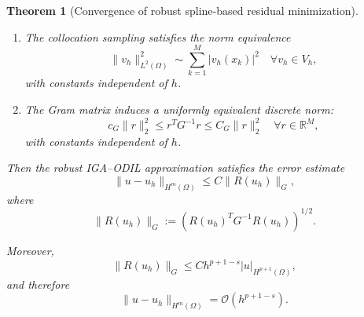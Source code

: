 \documentclass[10pt,a4paper]{amsart}
\newtheorem{theorem}{Theorem}
\begin{document}
\begin{theorem}[Convergence of robust spline-based residual minimization]
\begin{enumerate}
\item
The collocation sampling satisfies the norm equivalence
\begin{equation}
\|v_h\|_{L^2(\Omega)}^2
\sim
\sum_{k=1}^{M}
|v_h(x_k)|^2
\quad
\forall v_h\in V_h,
\label{eq:sampling_equivalence_theorem}
\end{equation}
with constants independent of $h$.

\item
The Gram matrix induces a uniformly equivalent discrete norm:
\begin{equation}
c_G\|r\|_2^2
\le
r^TG^{-1}r
\le
C_G\|r\|_2^2
\quad
\forall r\in\mathbb{R}^M,
\label{eq:gram_equivalence_theorem}
\end{equation}
with constants independent of $h$.

\end{enumerate}

Then the robust IGA--ODIL approximation satisfies the error estimate
\begin{equation}
\|u-u_h\|_{H^m(\Omega)}
\le
C
\|R(u_h)\|_G,
\label{eq:error_equivalence}
\end{equation}
where
\begin{equation}
\|R(u_h)\|_G
:=
\left(
R(u_h)^TG^{-1}R(u_h)
\right)^{1/2}.
\label{eq:robust_norm}
\end{equation}

Moreover,
\begin{equation}
\|R(u_h)\|_G
\le
C
h^{p+1-s}
|u|_{H^{p+1}(\Omega)},
\label{eq:residual_convergence_theorem}
\end{equation}
and therefore
\begin{equation}
\|u-u_h\|_{H^m(\Omega)}
=
\mathcal{O}(h^{p+1-s}).
\label{eq:final_rate_theorem}
\end{equation}

\end{theorem}
\end{document}

